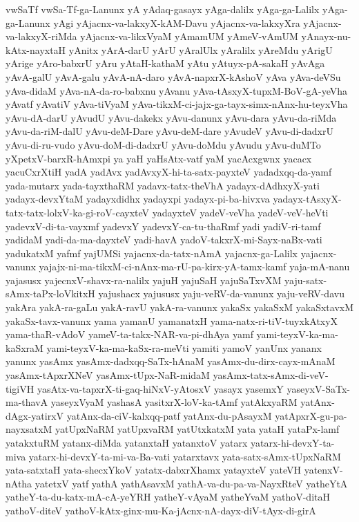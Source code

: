 {vwSaTf
vwSa-Tf-ga-Lanunx
yA
yAdaq-gasayx
yAga-dalilx
yAga-ga-Lalilx
yAga-ga-Lanunx
yAgi
yAjacnx-va-lakxyX-kAM-Davu
yAjacnx-va-lakxyXra
yAjacnx-va-lakxyX-riMda
yAjacnx-va-likxVyaM
yAmamUM
yAmeV-vAmUM
yAnayx-nu-kAtx-nayxtaH
yAnitx
yArA-darU
yArU
yAralUlx
yAralilx
yAreMdu
yArigU
yArige
yAro-babxrU
yAru
yAtaH-kathaM
yAtu
yAtuyx-pA-sakaH
yAvAga
yAvA-galU
yAvA-galu
yAvA-nA-daro
yAvA-napxrX-kAshoV
yAva
yAva-deVSu
yAva-didaM
yAva-nA-da-ro-babxnu
yAvanu
yAva-tAsxyX-tupxM-BoV-gA-yeVha
yAvatf
yAvatiV
yAva-tiVyaM
yAva-tikxM-ci-jajx-ga-tayx-simx-nAnx-hu-teyxVha
yAvu-dA-darU
yAvudU
yAvu-dakekx
yAvu-danunx
yAvu-dara
yAvu-da-riMda
yAvu-da-riM-dalU
yAvu-deM-Dare
yAvu-deM-dare
yAvudeV
yAvu-di-dadxrU
yAvu-di-ru-vudo
yAvu-doM-di-dadxrU
yAvu-doMdu
yAvudu
yAvu-duMTo
yXpetxV-barxR-hAmxpi
ya
yaH
yaHsAtx-vatf
yaM
yacAcxgwnx
yacacx
yacuCxrXtiH
yadA
yadAvx
yadAvxyX-hi-ta-satx-payxteV
yadadxqq-da-yamf
yada-mutarx
yada-tayxthaRM
yadavx-tatx-theVhA
yadayx-dAdhxyX-yati
yadayx-devxYtaM
yadayxdidhx
yadayxpi
yadayx-pi-ba-hivxva
yadayx-tAsxyX-tatx-tatx-lolxV-ka-gi-roV-cayxteV
yadayxteV
yadeV-veVha
yadeV-veV-heVti
yadevxV-di-ta-vayxmf
yadevxY
yadevxY-ca-tu-thaRmf
yadi
yadiV-ri-tamf
yadidaM
yadi-da-ma-dayxteV
yadi-havA
yadoV-takxrX-mi-Sayx-naBx-vati
yadukatxM
yafmf
yajUMSi
yajacnx-da-tatx-nAmA
yajacnx-ga-Lalilx
yajacnx-vanunx
yajajx-ni-ma-tikxM-ci-nAnx-ma-rU-pa-kirx-yA-tamx-kamf
yaja-mA-nanu
yajasusx
yajecnxV-shavx-ra-nalilx
yajuH
yajuSaH
yajuSaTxvXM
yaju-satx-sAmx-taPx-loVkitxH
yajushacx
yajususx
yaju-veRV-da-vanunx
yaju-veRV-davu
yakAra
yakA-ra-gaLu
yakA-ravU
yakA-ra-vanunx
yakaSx
yakaSxM
yakaSxtavxM
yakaSx-tavx-vanunx
yama
yamanU
yamanatxH
yama-natx-ri-tiV-tuyxkAtxyX
yama-thaR-vAdoV
yameV-ta-takx-NAR-va-pi-dhAya
yamf
yami-teyxV-ka-ma-kaSxraM
yami-teyxV-ka-ma-kaSx-ra-meVti
yamiti
yamoV
yanUnx
yananx
yanunx
yasAmx
yasAmx-dadxqq-SaTx-hAnaM
yasAmx-du-dirx-cayx-mAnaM
yasAmx-tApxrXNeV
yasAmx-tUpx-NaR-midaM
yasAmx-tatx-sAmx-di-veV-tigiVH
yasAtx-va-tapxrX-ti-gaq-hiNxV-yAtosxV
yasayx
yasemxY
yaseyxV-SaTx-ma-thavA
yaseyxVyaM
yashasA
yasitxrX-loV-ka-tAmf
yatAkxyaRM
yatAnx-dAgx-yatirxV
yatAnx-da-ciV-kalxqq-patf
yatAnx-du-pAsayxM
yatApxrX-gu-pa-nayxsatxM
yatUpxNaRM
yatUpxvaRM
yatUtxkatxM
yata
yataH
yataPx-lamf
yatakxtuRM
yatanx-diMda
yatanxtaH
yatanxtoV
yatarx
yatarx-hi-devxY-ta-miva
yatarx-hi-devxY-ta-mi-va-Ba-vati
yatarxtavx
yata-satx-sAmx-tUpxNaRM
yata-satxtaH
yata-shecxYkoV
yatatx-dabxrXhamx
yatayxteV
yateVH
yatenxV-nAtha
yatetxV
yatf
yathA
yathAsavxM
yathA-va-du-pa-va-NayxRteV
yatheYtA
yatheY-ta-du-katx-mA-cA-yeYRH
yatheY-vAyaM
yatheYvaM
yathoV-ditaH
yathoV-diteV
yathoV-kAtx-ginx-mu-Ka-jAcnx-nA-dayx-diV-tAyx-di-girA
}
